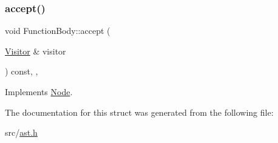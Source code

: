 \subsubsection{\texorpdfstring{accept()}{accept()}}
{\footnotesize\ttfamily void Function\+Body\+::accept (\begin{DoxyParamCaption}\item[{\hyperlink{struct_visitor}{Visitor} \&}]{visitor }\end{DoxyParamCaption}) const\hspace{0.3cm}{\ttfamily [inline]}, {\ttfamily [override]}, {\ttfamily [virtual]}}



Implements \hyperlink{struct_node_a10bd7af968140bbf5fa461298a969c71}{Node}.



The documentation for this struct was generated from the following file\+:\begin{DoxyCompactItemize}
\item 
src/\hyperlink{ast_8h}{ast.\+h}\end{DoxyCompactItemize}
